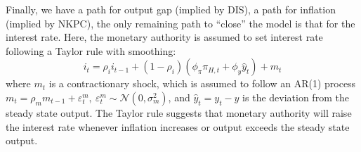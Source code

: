 Finally, we have a path for output gap (implied by DIS), a path for inflation (implied by NKPC), the only remaining path to ``close'' the model is that for the interest rate. Here, the monetary authority is assumed to set interest rate following a Taylor rule with smoothing:
\begin{equation}
    i_t = \rho_i i_{t-1} + (1-\rho_i)(\phi_\pi \pi_{H,t}+ \phi_y \hat{y}_t) + m_t
\end{equation}
where $m_t$ is a contractionary shock, which is assumed to follow an AR(1) process $m_t = \rho_m m_{t-1} + \varepsilon^m_{t},\ \varepsilon^m_{t} \sim \mathcal{N}(0,\sigma^2_m)$, and $\hat{y}_t = y_t - y$ is the deviation from the steady state output. The Taylor rule suggests that monetary authority will raise the interest rate whenever inflation increases or output exceeds the steady state output.



